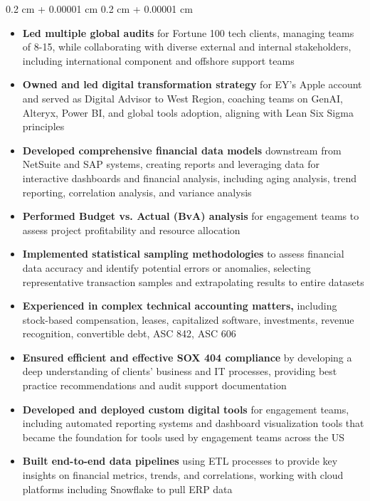 \documentclass[10pt, letterpaper]{article}
\newenvironment{highlights}{
    \begin{itemize}[
        topsep=0.10 cm,
        parsep=0.10 cm,
        partopsep=0pt,
        itemsep=0pt,
        leftmargin=0.4 cm + 10pt
    ]
}{
    \end{itemize}
} %
\newenvironment{onecolentry}{
    \begin{adjustwidth}{
        0.2 cm + 0.00001 cm
    }{
        0.2 cm + 0.00001 cm
    }
}{
    \end{adjustwidth}
} %
\begin{document}
        \begin{onecolentry}
            \begin{highlights}
                \item \textbf{Led multiple global audits} for Fortune 100 tech clients, managing teams of 8-15, while collaborating with diverse external and internal stakeholders, including international component and offshore support teams
                \item \textbf{Owned and led digital transformation strategy} for EY's Apple account and served as Digital Advisor to West Region, coaching teams on GenAI, Alteryx, Power BI, and global tools adoption, aligning with Lean Six Sigma principles
                \item \textbf{Developed comprehensive financial data models} downstream from NetSuite and SAP systems, creating reports and leveraging data for interactive dashboards and financial analysis, including aging analysis, trend reporting, correlation analysis, and variance analysis
                \item \textbf{Performed Budget vs. Actual (BvA) analysis} for engagement teams to assess project profitability and resource allocation
                \item \textbf{Implemented statistical sampling methodologies} to assess financial data accuracy and identify potential errors or anomalies, selecting representative transaction samples and extrapolating results to entire datasets
                 \item \textbf{Experienced in complex technical accounting matters,} including stock-based compensation, leases, capitalized software, investments, revenue recognition, convertible debt, ASC 842, ASC 606 %
                 \item \textbf{Ensured efficient and effective SOX 404 compliance} by developing a deep understanding of clients' business and IT processes, providing best practice recommendations and audit support documentation
                \item \textbf{Developed and deployed custom digital tools} for engagement teams, including automated reporting systems and dashboard visualization tools that became the foundation for tools used by engagement teams across the US
                \item \textbf{Built end-to-end data pipelines} using ETL processes to provide key insights on financial metrics, trends, and correlations, working with cloud platforms including Snowflake to pull ERP data

\end{highlights}
\end{onecolentry}
\end{document}
